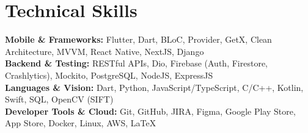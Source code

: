 \medskip

\resumeItemListStart
{}
\resumeItemListEnd
\resumeItemListEnd

\resumeSubHeadingListEnd

\section{Technical Skills}
\begin{itemize}[leftmargin=0.15in, label={}]
  \small{\item{
        \textbf{Mobile \& Frameworks:} {Flutter, Dart, BLoC, Provider, GetX, Clean Architecture, MVVM, React Native, NextJS, Django} \\
        \textbf{Backend \& Testing:} {RESTful APIs, Dio, Firebase (Auth, Firestore, Crashlytics), Mockito, PostgreSQL, NodeJS, ExpressJS} \\
        \textbf{Languages \& Vision:} {Dart, Python, JavaScript/TypeScript, C/C++, Kotlin, Swift, SQL, OpenCV (SIFT)} \\
        \textbf{Developer Tools \& Cloud:} {Git, GitHub, JIRA, Figma, Google Play Store, App Store, Docker, Linux, AWS, \LaTeX\EndAccSupp{}} \\
        }}
\end{itemize}
